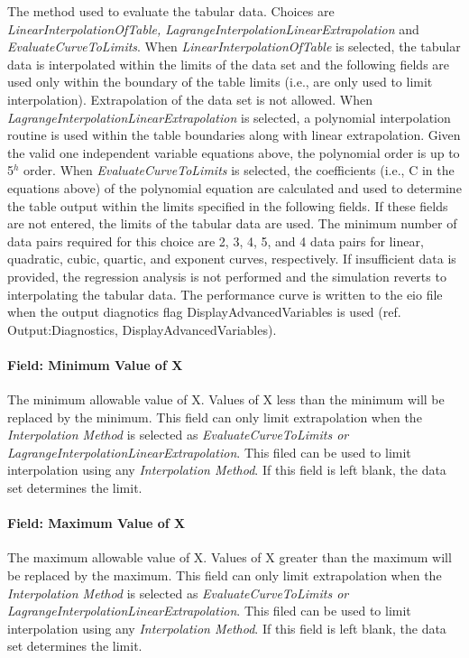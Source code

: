 The method used to evaluate the tabular data. Choices are \emph{LinearInterpolationOfTable, LagrangeInterpolationLinearExtrapolation} and \emph{EvaluateCurveToLimits}. When \emph{LinearInterpolationOfTable} is selected, the tabular data is interpolated within the limits of the data set and the following fields are used only within the boundary of the table limits (i.e., are only used to limit interpolation). Extrapolation of the data set is not allowed. When \emph{LagrangeInterpolationLinearExtrapolation} is selected, a polynomial interpolation routine is used within the table boundaries along with linear extrapolation. Given the valid one independent variable equations above, the polynomial order is up to 5\(^{h}\) order. When \emph{EvaluateCurveToLimits} is selected, the coefficients (i.e., C in the equations above) of the polynomial equation are calculated and used to determine the table output within the limits specified in the following fields. If these fields are not entered, the limits of the tabular data are used. The minimum number of data pairs required for this choice are 2, 3, 4, 5, and 4 data pairs for linear, quadratic, cubic, quartic, and exponent curves, respectively. If insufficient data is provided, the regression analysis is not performed and the simulation reverts to interpolating the tabular data. The performance curve is written to the eio file when the output diagnotics flag DisplayAdvancedVariables is used (ref. Output:Diagnostics, DisplayAdvancedVariables).

\paragraph{Field: Minimum Value of X}\label{field-minimum-value-of-x-000}

The minimum allowable value of X. Values of X less than the minimum will be replaced by the minimum. This field can only limit extrapolation when the \emph{Interpolation Method} is selected as \emph{EvaluateCurveToLimits or LagrangeInterpolationLinearExtrapolation}. This filed can be used to limit interpolation using any \emph{Interpolation Method}. If this field is left blank, the data set determines the limit.

\paragraph{Field: Maximum Value of X}\label{field-maximum-value-of-x-000}

The maximum allowable value of X. Values of X greater than the maximum will be replaced by the maximum. This field can only limit extrapolation when the \emph{Interpolation Method} is selected as \emph{EvaluateCurveToLimits or LagrangeInterpolationLinearExtrapolation}. This filed can be used to limit interpolation using any \emph{Interpolation Method}. If this field is left blank, the data set determines the limit.


